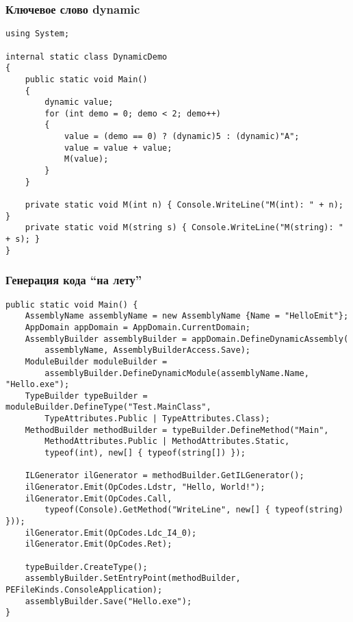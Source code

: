 \documentclass[xetex,mathserif,serif]{beamer}
\begin{document}
	\begin{frame}[fragile]
		\frametitle{Ключевое слово dynamic}
		\begin{scriptsize}
			\begin{verbatim}
using System;

internal static class DynamicDemo
{
    public static void Main()
    {
        dynamic value;
        for (int demo = 0; demo < 2; demo++)
        {
            value = (demo == 0) ? (dynamic)5 : (dynamic)"A";
            value = value + value;
            M(value);
        }
    }

    private static void M(int n) { Console.WriteLine("M(int): " + n); }
    private static void M(string s) { Console.WriteLine("M(string): " + s); }
}
			\end{verbatim}
		\end{scriptsize}
	\end{frame}

	\begin{frame}[fragile]
		\frametitle{Генерация кода ``на лету''}
		\begin{scriptsize}
			\begin{verbatim}
public static void Main() {
    AssemblyName assemblyName = new AssemblyName {Name = "HelloEmit"};
    AppDomain appDomain = AppDomain.CurrentDomain;
    AssemblyBuilder assemblyBuilder = appDomain.DefineDynamicAssembly(
        assemblyName, AssemblyBuilderAccess.Save);
    ModuleBuilder moduleBuilder = 
        assemblyBuilder.DefineDynamicModule(assemblyName.Name, "Hello.exe");
    TypeBuilder typeBuilder = moduleBuilder.DefineType("Test.MainClass",
        TypeAttributes.Public | TypeAttributes.Class);
    MethodBuilder methodBuilder = typeBuilder.DefineMethod("Main",
        MethodAttributes.Public | MethodAttributes.Static,
        typeof(int), new[] { typeof(string[]) });

    ILGenerator ilGenerator = methodBuilder.GetILGenerator();
    ilGenerator.Emit(OpCodes.Ldstr, "Hello, World!");
    ilGenerator.Emit(OpCodes.Call,
        typeof(Console).GetMethod("WriteLine", new[] { typeof(string) }));
    ilGenerator.Emit(OpCodes.Ldc_I4_0);
    ilGenerator.Emit(OpCodes.Ret);

    typeBuilder.CreateType();
    assemblyBuilder.SetEntryPoint(methodBuilder, PEFileKinds.ConsoleApplication);
    assemblyBuilder.Save("Hello.exe");
}
			\end{verbatim}
		\end{scriptsize}
	\end{frame}
\end{document}
